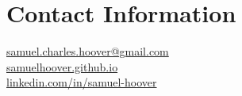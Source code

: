 \section{\sc Contact Information}
\href{mailto:samuel.charles.hoover@gmail.com}{samuel.charles.hoover@gmail.com}\\
\href{https://samuelhoover.github.io}{samuelhoover.github.io}\\
\href{https://www.linkedin.com/in/samuel-hoover}{linkedin.com/in/samuel-hoover}\\


